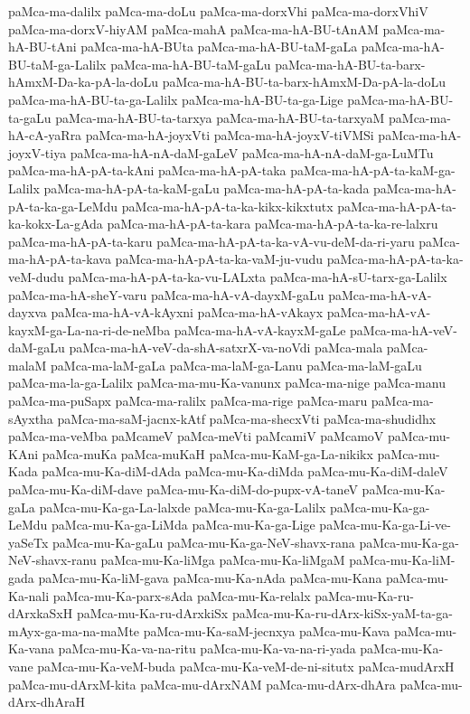 {paMca-ma-dalilx
paMca-ma-doLu
paMca-ma-dorxVhi
paMca-ma-dorxVhiV
paMca-ma-dorxV-hiyAM
paMca-mahA
paMca-ma-hA-BU-tAnAM
paMca-ma-hA-BU-tAni
paMca-ma-hA-BUta
paMca-ma-hA-BU-taM-gaLa
paMca-ma-hA-BU-taM-ga-Lalilx
paMca-ma-hA-BU-taM-gaLu
paMca-ma-hA-BU-ta-barx-hAmxM-Da-ka-pA-la-doLu
paMca-ma-hA-BU-ta-barx-hAmxM-Da-pA-la-doLu
paMca-ma-hA-BU-ta-ga-Lalilx
paMca-ma-hA-BU-ta-ga-Lige
paMca-ma-hA-BU-ta-gaLu
paMca-ma-hA-BU-ta-tarxya
paMca-ma-hA-BU-ta-tarxyaM
paMca-ma-hA-cA-yaRra
paMca-ma-hA-joyxVti
paMca-ma-hA-joyxV-tiVMSi
paMca-ma-hA-joyxV-tiya
paMca-ma-hA-nA-daM-gaLeV
paMca-ma-hA-nA-daM-ga-LuMTu
paMca-ma-hA-pA-ta-kAni
paMca-ma-hA-pA-taka
paMca-ma-hA-pA-ta-kaM-ga-Lalilx
paMca-ma-hA-pA-ta-kaM-gaLu
paMca-ma-hA-pA-ta-kada
paMca-ma-hA-pA-ta-ka-ga-LeMdu
paMca-ma-hA-pA-ta-ka-kikx-kikxtutx
paMca-ma-hA-pA-ta-ka-kokx-La-gAda
paMca-ma-hA-pA-ta-kara
paMca-ma-hA-pA-ta-ka-re-lalxru
paMca-ma-hA-pA-ta-karu
paMca-ma-hA-pA-ta-ka-vA-vu-deM-da-ri-yaru
paMca-ma-hA-pA-ta-kava
paMca-ma-hA-pA-ta-ka-vaM-ju-vudu
paMca-ma-hA-pA-ta-ka-veM-dudu
paMca-ma-hA-pA-ta-ka-vu-LALxta
paMca-ma-hA-sU-tarx-ga-Lalilx
paMca-ma-hA-sheY-varu
paMca-ma-hA-vA-dayxM-gaLu
paMca-ma-hA-vA-dayxva
paMca-ma-hA-vA-kAyxni
paMca-ma-hA-vAkayx
paMca-ma-hA-vA-kayxM-ga-La-na-ri-de-neMba
paMca-ma-hA-vA-kayxM-gaLe
paMca-ma-hA-veV-daM-gaLu
paMca-ma-hA-veV-da-shA-satxrX-va-noVdi
paMca-mala
paMca-malaM
paMca-ma-laM-gaLa
paMca-ma-laM-ga-Lanu
paMca-ma-laM-gaLu
paMca-ma-la-ga-Lalilx
paMca-ma-mu-Ka-vanunx
paMca-ma-nige
paMca-manu
paMca-ma-puSapx
paMca-ma-ralilx
paMca-ma-rige
paMca-maru
paMca-ma-sAyxtha
paMca-ma-saM-jacnx-kAtf
paMca-ma-shecxVti
paMca-ma-shudidhx
paMca-ma-veMba
paMcameV
paMca-meVti
paMcamiV
paMcamoV
paMca-mu-KAni
paMca-muKa
paMca-muKaH
paMca-mu-KaM-ga-La-nikikx
paMca-mu-Kada
paMca-mu-Ka-diM-dAda
paMca-mu-Ka-diMda
paMca-mu-Ka-diM-daleV
paMca-mu-Ka-diM-dave
paMca-mu-Ka-diM-do-pupx-vA-taneV
paMca-mu-Ka-gaLa
paMca-mu-Ka-ga-La-lalxde
paMca-mu-Ka-ga-Lalilx
paMca-mu-Ka-ga-LeMdu
paMca-mu-Ka-ga-LiMda
paMca-mu-Ka-ga-Lige
paMca-mu-Ka-ga-Li-ve-yaSeTx
paMca-mu-Ka-gaLu
paMca-mu-Ka-ga-NeV-shavx-rana
paMca-mu-Ka-ga-NeV-shavx-ranu
paMca-mu-Ka-liMga
paMca-mu-Ka-liMgaM
paMca-mu-Ka-liM-gada
paMca-mu-Ka-liM-gava
paMca-mu-Ka-nAda
paMca-mu-Kana
paMca-mu-Ka-nali
paMca-mu-Ka-parx-sAda
paMca-mu-Ka-relalx
paMca-mu-Ka-ru-dArxkaSxH
paMca-mu-Ka-ru-dArxkiSx
paMca-mu-Ka-ru-dArx-kiSx-yaM-ta-ga-mAyx-ga-ma-na-maMte
paMca-mu-Ka-saM-jecnxya
paMca-mu-Kava
paMca-mu-Ka-vana
paMca-mu-Ka-va-na-ritu
paMca-mu-Ka-va-na-ri-yada
paMca-mu-Ka-vane
paMca-mu-Ka-veM-buda
paMca-mu-Ka-veM-de-ni-situtx
paMca-mudArxH
paMca-mu-dArxM-kita
paMca-mu-dArxNAM
paMca-mu-dArx-dhAra
paMca-mu-dArx-dhAraH
}
